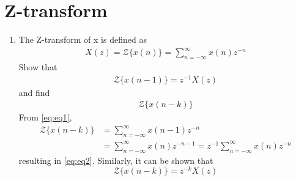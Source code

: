 \documentclass[journal,12pt,twocolumn]{IEEEtran}
\theoremstyle{remark}
\begin{document}
\section{Z-transform}
\begin{enumerate}[label=\thesection.\arabic*]
\item The Z-transform of x is defined as
%
\begin{align}
\label{eq:eq1}
X(z)={\mathcal {Z}}\{x(n)\}=\sum _{n=-\infty }^{\infty }x(n)z^{-n}
\end{align}
%
Show that
\begin{align}
\label{eq:eq2}
{\mathcal {Z}}\{x(n-1)\} = z^{-1}X(z)
\end{align}
and find
\begin{align}
	{\mathcal {Z}}\{x(n-k)\} 
\end{align}
\solution From \eqref{eq:eq1},
\begin{align}
{\mathcal {Z}}\{x(n-k)\} &=\sum _{n=-\infty }^{\infty }x(n-1)z^{-n}\\
&=\sum _{n=-\infty }^{\infty }x(n)z^{-n-1} = z^{-1}\sum _{n=-\infty }^{\infty }x(n)z^{-n}
\end{align}
resulting in \eqref{eq:eq2}. Similarly, it can be shown that
%
\begin{equation}
\label{eq:z_trans_shift}
	{\mathcal {Z}}\{x(n-k)\} = z^{-k}X(z)
\end{equation}


\end{enumerate}
\end{document}
